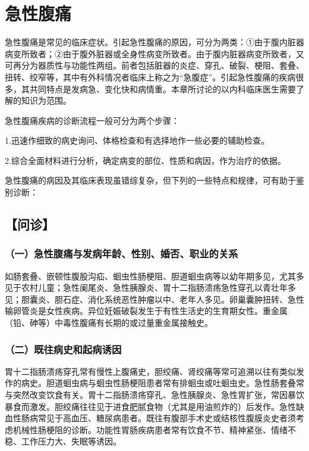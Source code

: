 \chapter{急性腹痛}

急性腹痛是常见的临床症状。引起急性腹痛的原因，可分为两类：①由于腹内脏器病变所致者；②由于腹外脏器或全身性病变所致者。由于腹内脏器病变所致者，又可再分为器质性与功能性两组。前者包括脏器的炎症、穿孔、破裂、梗阻、套叠、扭转、绞窄等，其中有外科情况者临床上称之为“急腹症”。引起急性腹痛的疾病很多，其共同特点是发病急、变化快和病情重。本章所讨论的以内科临床医生需要了解的知识为范围。

急性腹痛疾病的诊断流程一般可分为两个步骤：

1.迅速作细致的病史询问、体格检查和有选择地作一些必要的辅助检查。

2.综合全面材料进行分析，确定病变的部位、性质和病因，作为治疗的依据。

急性腹痛的病因及其临床表现虽错综复杂，但下列的一些特点和规律，可有助于鉴别诊断：

\section{【问诊】}

\subsection{（一）急性腹痛与发病年龄、性别、婚否、职业的关系}

如肠套叠、嵌顿性腹股沟疝、蛔虫性肠梗阻、胆道蛔虫病等以幼年期多见，尤其多见于农村儿童；急性阑尾炎、急性胰腺炎、胃十二指肠溃疡急性穿孔以青壮年多见；胆囊炎、胆石症、消化系统恶性肿瘤以中、老年人多见。卵巢囊肿扭转、急性输卵管炎是女性疾病。异位妊娠破裂发生于有性生活史的生育期女性。重金属（铅、砷等）中毒性腹痛有长期的或过量重金属接触史。

\subsection{（二）既往病史和起病诱因}

胃十二指肠溃疡穿孔常有慢性上腹痛史，胆绞痛、肾绞痛等常可追溯以往有类似发作的病史。胆道蛔虫病与蛔虫性肠梗阻患者常有排蛔虫或吐蛔虫史。急性肠套叠常与突然改变饮食有关。胃十二指肠溃疡穿孔、急性胰腺炎、急性胃扩张，常因暴饮暴食而激发。胆绞痛往往见于进食肥腻食物（尤其是用油煎炸的）后发作。急性缺血性肠病常见于高血压、糖尿病患者。既往有腹部手术史或结核性腹膜炎史者须考虑机械性肠梗阻的诊断。功能性胃肠疾病患者常有饮食不节、精神紧张、情绪不稳、工作压力大、失眠等诱因。

